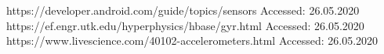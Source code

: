 \documentclass[conference]{IEEEtran}
\begin{document}
\begin{thebibliography}{00}
 https://developer.android.com/guide/topics/sensors Accessed: 26.05.2020
 https://ef.engr.utk.edu/hyperphysics/hbase/gyr.html Accessed: 26.05.2020
 https://www.livescience.com/40102-accelerometers.html Accessed: 26.05.2020
\end{thebibliography}
\vspace{12pt}
\end{document}
